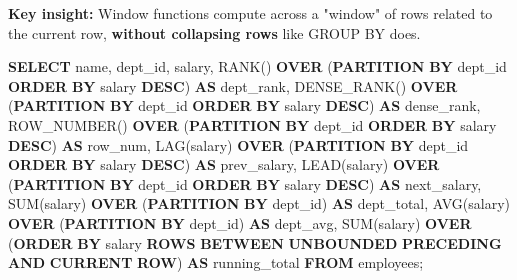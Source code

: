 \documentclass[11pt]{article}
\newenvironment{Shaded}{\begin{snugshade}}{\end{snugshade}}
\newcommand{\FunctionTok}[1]{\textcolor[rgb]{0.56,0.27,0.68}{#1}}
\newcommand{\KeywordTok}[1]{\textcolor[rgb]{0.81,0.81,0.76}{\textbf{#1}}}
\newcommand{\NormalTok}[1]{\textcolor[rgb]{0.81,0.81,0.76}{#1}}
\begin{document}
\textbf{Key insight:} Window functions compute across a "window" of rows related to the current row, \textbf{without collapsing rows} like GROUP BY does.


\begin{Shaded}
\begin{Highlighting}[]
\KeywordTok{SELECT}
\NormalTok{    name,}
\NormalTok{    dept\_id,}
\NormalTok{    salary,}
    \FunctionTok{RANK}\NormalTok{()       }\KeywordTok{OVER}\NormalTok{ (}\KeywordTok{PARTITION} \KeywordTok{BY}\NormalTok{ dept\_id }\KeywordTok{ORDER} \KeywordTok{BY}\NormalTok{ salary }\KeywordTok{DESC}\NormalTok{) }\KeywordTok{AS}\NormalTok{ dept\_rank,}
    \FunctionTok{DENSE\_RANK}\NormalTok{() }\KeywordTok{OVER}\NormalTok{ (}\KeywordTok{PARTITION} \KeywordTok{BY}\NormalTok{ dept\_id }\KeywordTok{ORDER} \KeywordTok{BY}\NormalTok{ salary }\KeywordTok{DESC}\NormalTok{) }\KeywordTok{AS} \FunctionTok{dense\_rank}\NormalTok{,}
    \FunctionTok{ROW\_NUMBER}\NormalTok{() }\KeywordTok{OVER}\NormalTok{ (}\KeywordTok{PARTITION} \KeywordTok{BY}\NormalTok{ dept\_id }\KeywordTok{ORDER} \KeywordTok{BY}\NormalTok{ salary }\KeywordTok{DESC}\NormalTok{) }\KeywordTok{AS}\NormalTok{ row\_num,}
    \FunctionTok{LAG}\NormalTok{(salary)  }\KeywordTok{OVER}\NormalTok{ (}\KeywordTok{PARTITION} \KeywordTok{BY}\NormalTok{ dept\_id }\KeywordTok{ORDER} \KeywordTok{BY}\NormalTok{ salary }\KeywordTok{DESC}\NormalTok{) }\KeywordTok{AS}\NormalTok{ prev\_salary,}
    \FunctionTok{LEAD}\NormalTok{(salary) }\KeywordTok{OVER}\NormalTok{ (}\KeywordTok{PARTITION} \KeywordTok{BY}\NormalTok{ dept\_id }\KeywordTok{ORDER} \KeywordTok{BY}\NormalTok{ salary }\KeywordTok{DESC}\NormalTok{) }\KeywordTok{AS}\NormalTok{ next\_salary,}
    \FunctionTok{SUM}\NormalTok{(salary)  }\KeywordTok{OVER}\NormalTok{ (}\KeywordTok{PARTITION} \KeywordTok{BY}\NormalTok{ dept\_id)                      }\KeywordTok{AS}\NormalTok{ dept\_total,}
    \FunctionTok{AVG}\NormalTok{(salary)  }\KeywordTok{OVER}\NormalTok{ (}\KeywordTok{PARTITION} \KeywordTok{BY}\NormalTok{ dept\_id)                      }\KeywordTok{AS}\NormalTok{ dept\_avg,}
    \FunctionTok{SUM}\NormalTok{(salary)  }\KeywordTok{OVER}\NormalTok{ (}\KeywordTok{ORDER} \KeywordTok{BY}\NormalTok{ salary }\KeywordTok{ROWS} \KeywordTok{BETWEEN} \KeywordTok{UNBOUNDED} \KeywordTok{PRECEDING} \KeywordTok{AND} \KeywordTok{CURRENT} \KeywordTok{ROW}\NormalTok{) }\KeywordTok{AS}\NormalTok{ running\_total}
\KeywordTok{FROM}\NormalTok{ employees;}
\end{Highlighting}
\end{Shaded}
\end{document}
